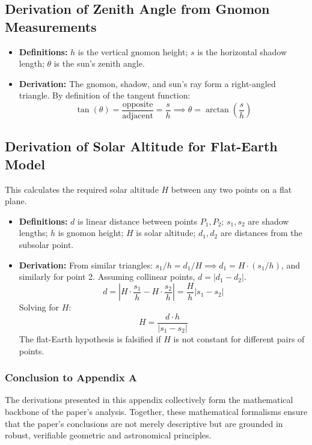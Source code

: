 \documentclass[11pt]{article}
\DeclareMathOperator{\atan}{arctan}
\begin{document}
\subsection{Derivation of Zenith Angle from Gnomon Measurements}
\begin{itemize}
    \item \textbf{Definitions:} $h$ is the vertical gnomon height; $s$ is the horizontal shadow length; $\theta$ is the sun's zenith angle.
    \item \textbf{Derivation:} The gnomon, shadow, and sun's ray form a right-angled triangle. By definition of the tangent function:
    \[
    \tan(\theta) = \frac{\text{opposite}}{\text{adjacent}} = \frac{s}{h} \implies \theta = \atan\left(\frac{s}{h}\right)
    \]
\end{itemize}

\subsection{Derivation of Solar Altitude for Flat-Earth Model}
This calculates the required solar altitude $H$ between any two points on a flat plane.
\begin{itemize}
    \item \textbf{Definitions:} $d$ is linear distance between points $P_1, P_2$; $s_1, s_2$ are shadow lengths; $h$ is gnomon height; $H$ is solar altitude; $d_1, d_2$ are distances from the subsolar point.
    \item \textbf{Derivation:} From similar triangles: $s_1 / h = d_1 / H \implies d_1 = H \cdot (s_1 / h)$, and similarly for point 2. Assuming collinear points, $d = |d_1 - d_2|$.
    \[
    d = \left| H \cdot \frac{s_1}{h} - H \cdot \frac{s_2}{h} \right| = \frac{H}{h} |s_1 - s_2|
    \]
    Solving for $H$:
    \[
    H = \frac{d \cdot h}{|s_1 - s_2|}
    \]
    The flat-Earth hypothesis is falsified if $H$ is not constant for different pairs of points.
\end{itemize}

\subsubsection*{Conclusion to Appendix A}
The derivations presented in this appendix collectively form the mathematical backbone of the paper's analysis. Together, these mathematical formalisms ensure that the paper's conclusions are not merely descriptive but are grounded in robust, verifiable geometric and astronomical principles.
\end{document}
